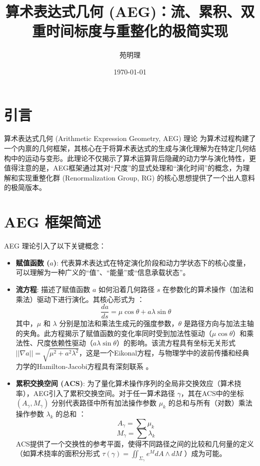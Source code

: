 \documentclass[UTF8]{ctexart}
\title{算术表达式几何 (AEG)：流、累积、双重时间标度与重整化的极简实现}
\author{苑明理}
\date{\today}
\begin{document}
\maketitle

\section{引言}
算术表达式几何 (Arithmetic Expression Geometry, AEG) 理论 \cite{YuanAEG} 为算术过程构建了一个内禀的几何框架，其核心在于将算术表达式的生成与演化理解为在特定几何结构中的运动与变形。此理论不仅揭示了算术运算背后隐藏的动力学与演化特性，更值得注意的是，AEG框架通过其对“尺度”的显式处理和“演化时间”的概念，为理解和实现重整化群 (Renormalization Group, RG) 的核心思想提供了一个出人意料的极简版本。

\section{AEG 框架简述}

AEG 理论引入了以下关键概念：

\begin{itemize}
    \item \textbf{赋值函数 ($a$)}: 代表算术表达式在特定演化阶段和动力学状态下的核心度量，可以理解为一种广义的“值”、“能量”或“信息承载状态”。
    \item \textbf{流方程}: 描述了赋值函数 $a$ 如何沿着几何路径 $s$ 在参数化的算术操作（加法和乘法）驱动下进行演化。其核心形式为 \cite[Sec 3.1, Eq. 30]{YuanAEG}：
    $$\frac{da}{ds} = \mu \cos\theta + a\lambda \sin\theta$$
    其中，$\mu$ 和 $\lambda$ 分别是加法和乘法生成元的强度参数，$\theta$ 是路径方向与加法主轴的夹角。此方程揭示了赋值函数的变化率同时受到加法性驱动（$\mu \cos\theta$）和乘法性、尺度依赖性驱动（$a\lambda \sin\theta$）的影响。该流方程具有坐标无关形式 $||\nabla a|| = \sqrt{\mu^2 + a^2\lambda^2}$，这是一个Eikonal方程，与物理学中的波前传播和经典力学的Hamilton-Jacobi方程具有深刻联系 \cite[Sec 3.5, Eq. 57, 58]{YuanAEG}。
    \item \textbf{累积交换空间 (ACS)}: 为了量化算术操作序列的全局非交换效应（算术挠率），AEG引入了累积交换空间。对于任一算术路径 $\gamma$，其在ACS中的坐标 $(A_\gamma, M_\gamma)$ 分别代表路径中所有加法操作参数 $\mu_k$ 的总和与所有（对数）乘法操作参数 $\lambda_k$ 的总和 \cite[Sec 5.1]{YuanAEG}：
    $$A_\gamma = \sum \mu_k$$
    $$M_\gamma = \sum \lambda_k$$
    ACS提供了一个交换性的参考平面，使得不同路径之间的比较和几何量的定义（如算术挠率的面积分形式 $\tau(\gamma) = \iint_{\Sigma_\gamma} e^M dA \wedge dM$ \cite[Sec 5.1, Eq. 75]{YuanAEG}）成为可能。
\end{itemize}
\end{document}
